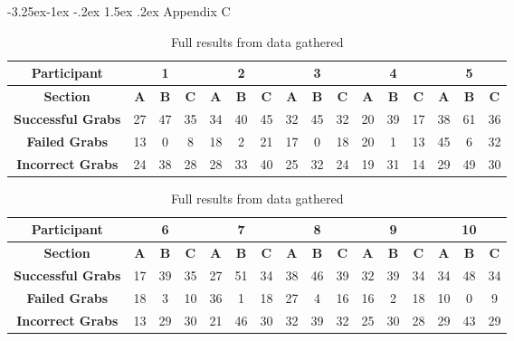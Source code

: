\documentclass[12pt]{article}
\makeatletter
\renewcommand{\subsection}{\@startsection{subsection}{2}{\z@}%
             {-3.25ex\@plus -1ex \@minus -.2ex}%
             {1.5ex \@plus .2ex}%
             {\normalfont\large\scshape\bfseries}}
\makeatother
\begin{document}
\subsection{Appendix C}

\begin{table}[!ht]
\centering
\begin{tabular}{ |c|c|c|c|c|c|c|c|c|c|c|c|c|c|c|c| }
 	\hline
	\textbf{Participant} & \multicolumn{3}{|c|}{\textbf{1}} &  \multicolumn{3}{|c|}{\textbf{2}} & \multicolumn{3}{|c|}{\textbf{3}} & \multicolumn{3}{|c|}{\textbf{4}} & \multicolumn{3}{|c|}{\textbf{5}} \\
	\hline
	\textbf{Section} & \textbf{A} & \textbf{B} & \textbf{C} & \textbf{A} & \textbf{B} & \textbf{C} & \textbf{A} & \textbf{B} & \textbf{C} & \textbf{A} & \textbf{B} & \textbf{C} & \textbf{A} & \textbf{B} & \textbf{C} \\
	\hline
	\textbf{Successful Grabs} & 27 & 47 & 35 & 34 & 40 & 45 & 32 & 45 & 32 & 20 & 39 & 17 & 38 & 61 & 36 \\
	\hline
	\textbf{Failed Grabs} & 13 & 0 & 8 & 18 & 2 & 21 & 17 & 0 & 18 & 20 & 1 & 13 & 45 & 6 & 32 \\
	\hline
	\textbf{Incorrect Grabs} & 24 & 38 & 28 & 28 & 33 & 40 & 25 & 32 & 24 & 19 & 31 & 14 & 29 & 49 & 30 \\
	\hline
\end{tabular}

\centering
\vspace{1cm}\begin{tabular}{ |c|c|c|c|c|c|c|c|c|c|c|c|c|c|c|c| }
 	\hline
	\textbf{Participant} & \multicolumn{3}{|c|}{\textbf{6}} & \multicolumn{3}{|c|}{\textbf{7}} & \multicolumn{3}{|c|}{\textbf{8}} & \multicolumn{3}{|c|}{\textbf{9}} & \multicolumn{3}{|c|}{\textbf{10}} \\
	\hline
	\textbf{Section} & \textbf{A} & \textbf{B} & \textbf{C} & \textbf{A} & \textbf{B} & \textbf{C} & \textbf{A} & \textbf{B} & \textbf{C} & \textbf{A} & \textbf{B} & \textbf{C} & \textbf{A} & \textbf{B} & \textbf{C} \\
	\hline
	\textbf{Successful Grabs} & 17 & 39 & 35 & 27 & 51 & 34 & 38 & 46 & 39 & 32 & 39 & 34 & 34 & 48 & 34 \\
	\hline
	\textbf{Failed Grabs} & 18 & 3 & 10 & 36 & 1 & 18 & 27 & 4 & 16 & 16 & 2 & 18 & 10 & 0 & 9 \\
	\hline
	\textbf{Incorrect Grabs} & 13 & 29 & 30 & 21 & 46 & 30 & 32 & 39 & 32 & 25 & 30 & 28 & 29 & 43 & 29 \\
	\hline
\end{tabular}

\caption{Full results from data gathered}
\end{table}
\end{document}
